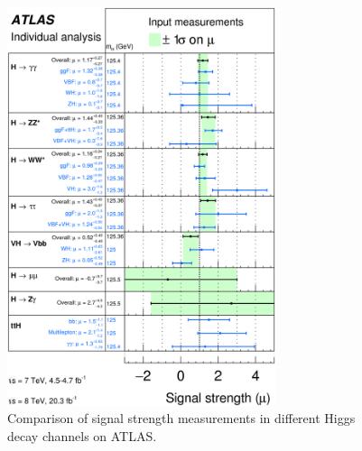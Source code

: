 \begin{figure}[h!]
  \centering
  \captionsetup{justification=centering}

  \includegraphics[width=0.7\textwidth]{figures/mu_summary}
  \caption{Comparison of signal strength measurements in different Higgs decay channels on ATLAS\cite{HiggsSummaryRun1}.}
  \label{fig:mu_summary}
\end{figure}

